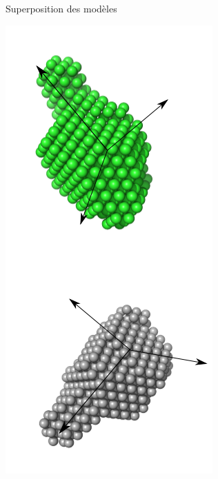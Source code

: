 \documentclass{beamer}
\begin{document}
\begin{frame}{Superposition des mod\`eles}
\begin{minipage}{0.70\linewidth}
\end{minipage} \hfill
\begin{minipage}{0.25\linewidth}
    \includegraphics[scale=0.3]{schemalign.png}
\end{minipage}

\end{frame}
\end{document}
